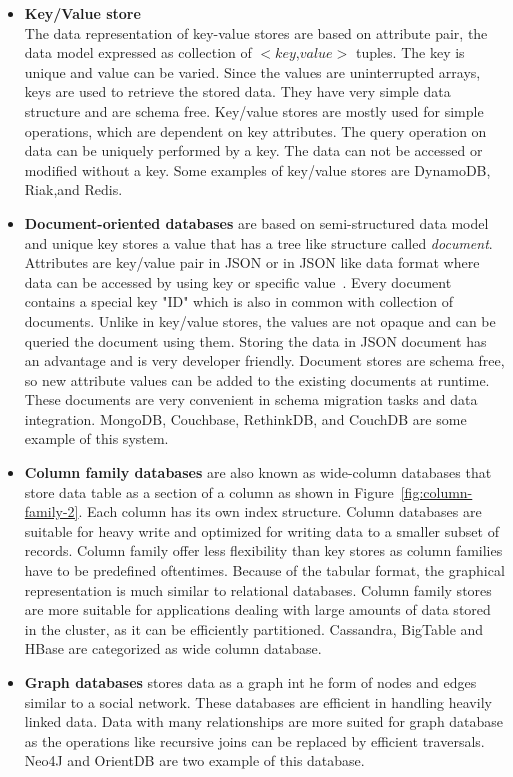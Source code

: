 	\begin{itemize}
		\item 
			\textbf{Key/Value store}\\ The data representation of key-value stores are based on attribute pair, the data model expressed as collection of $<$$key$,$value$$>$ tuples. The key is unique and value can be varied. Since the values are uninterrupted arrays, keys are used to retrieve the stored data. They have very simple data structure and are schema free. Key/value stores are mostly used for simple operations, which are dependent on key attributes. The query operation on data can be uniquely performed by a key. The data can not be accessed or modified without a key. Some examples of key/value stores are DynamoDB, Riak,and Redis.
		\item 
			\textbf{Document-oriented databases} are based on semi-structured data model and unique key stores a value that has a tree like structure called \textit{document}. Attributes are key/value pair in JSON or in JSON like data format where data can be accessed by using key or specific value~\citep{hecht2011nosql}. Every document contains a special key "ID" which is also in common with collection of documents. Unlike in key/value stores, the values are not opaque and can be queried the document using them. Storing the data in JSON document has an advantage and is very developer friendly. Document stores are schema free, so new attribute values can be added to the existing documents at runtime. These documents are very convenient in schema migration tasks and data integration.  MongoDB, Couchbase, RethinkDB, and CouchDB are some example of this system.
		\item 
			\textbf{Column family databases} are also known as wide-column databases that store data table as a section of a column as shown in Figure~\ref{fig:column-family-2}. Each column has its own index structure.
			 Column databases are suitable for heavy write and optimized for writing data to a smaller subset of records. Column family offer less flexibility than key stores as column families have to be predefined oftentimes. Because of the tabular format, the graphical representation is much similar to relational databases. Column family stores are more suitable for applications dealing with large amounts of data stored in the cluster, as it can be efficiently partitioned.  Cassandra, BigTable and HBase are categorized as wide column database.
		\item 
			\textbf{Graph databases} stores data as a  graph int he form of  nodes and edges similar to a social network. These databases are efficient in handling heavily linked data. Data with many relationships are more suited for graph database as the operations like recursive joins can be replaced by efficient traversals. Neo4J and OrientDB are two example of this database.
	\end{itemize}
